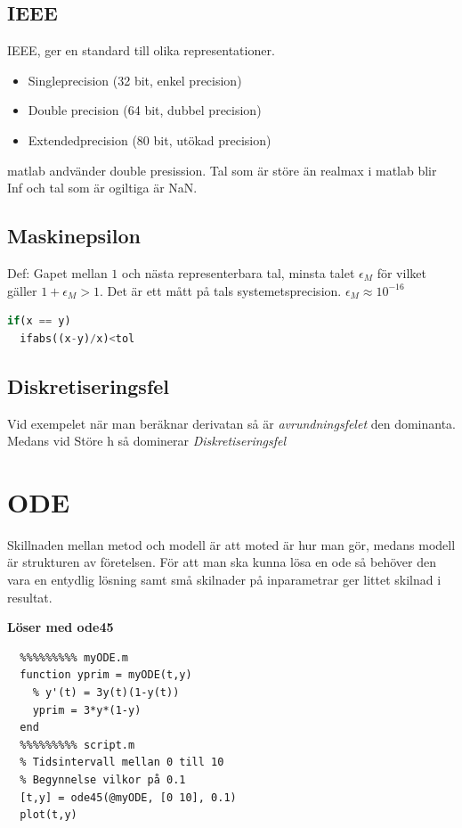 \subsection{IEEE}
IEEE, ger en standard till olika representationer.
\begin{itemize}
  \item Singleprecision (32 bit, enkel precision)
  \item Double precision (64 bit, dubbel precision)
  \item Extendedprecision (80 bit, utökad precision)
\end{itemize}
matlab andvänder double presission.
Tal som är störe än realmax i matlab blir Inf och tal som är ogiltiga är NaN.

\subsection{Maskinepsilon}
Def: Gapet mellan $1$ och nästa representerbara tal, minsta talet $\epsilon_M$ för vilket
gäller $1+\epsilon_M > 1$. Det är ett mått på tals systemetsprecision. $\epsilon_M \approx 10^{-16}$

\begin{lstlisting}[language=Python]
  if(x == y)
  ifabs((x-y)/x)<tol
\end{lstlisting}

\subsection{Diskretiseringsfel}
Vid exempelet när man beräknar derivatan så är \textit{avrundningsfelet} den dominanta. Medans
vid Störe h så dominerar \textit{Diskretiseringsfel}

\section{ODE}
Skillnaden mellan metod och modell är att moted är hur man gör, 
medans modell är strukturen av företelsen.
För att man ska kunna lösa en ode så behöver den vara en entydlig 
lösning samt små skilnader på inparametrar ger littet skilnad i resultat.

\textbf{Löser med ode45}
\begin{verbatim}
  %%%%%%%%% myODE.m
  function yprim = myODE(t,y)
    % y'(t) = 3y(t)(1-y(t))
    yprim = 3*y*(1-y)
  end
  %%%%%%%%% script.m
  % Tidsintervall mellan 0 till 10
  % Begynnelse vilkor på 0.1
  [t,y] = ode45(@myODE, [0 10], 0.1)
  plot(t,y)
\end{verbatim}

